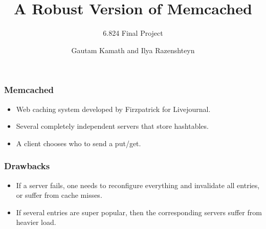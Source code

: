 \documentclass{beamer}
\title{A Robust Version of Memcached}
\subtitle{6.824 Final Project}
\author{Gautam Kamath and Ilya Razenshteyn}
\institute{MIT}
\begin{document}
    \begin{frame}
      \titlepage
    \end{frame}
    \begin{frame}
        \frametitle{Memcached}
        \begin{itemize}
            \item Web caching system developed by Firzpatrick for Livejournal.
            \item Several completely independent servers that store hashtables.
            \item A client chooses who to send a put/get.
        \end{itemize}
    \end{frame}
    \begin{frame}
        \frametitle{Drawbacks}
        \begin{itemize}
            \item If a server fails, one needs to reconfigure everything and invalidate
            all entries, or suffer from cache misses.
            \item If several entries are super popular, then the corresponding servers
            suffer from heavier load.
        \end{itemize}
    \end{frame}
\end{document}
